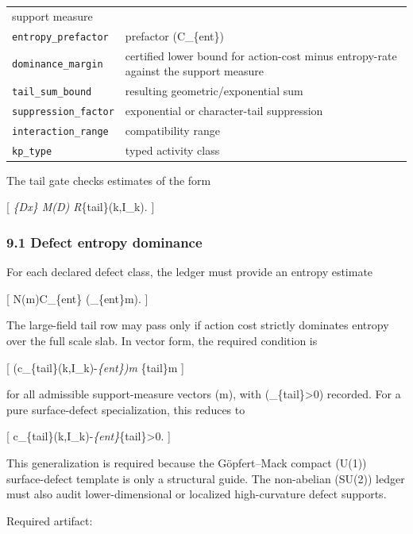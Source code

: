 \documentclass[
]{article}
\begin{document}
\begin{longtable}[]{@{}
  >{\raggedright\arraybackslash}p{}
  >{\raggedright\arraybackslash}p{}@{}}
support measure \\
\texttt{entropy\_prefactor} & prefactor (C\_\{\rm ent\}) \\
\texttt{dominance\_margin} & certified lower bound for action-cost minus
entropy-rate against the support measure \\
\texttt{tail\_sum\_bound} & resulting geometric/exponential sum \\
\texttt{suppression\_factor} & exponential or character-tail
suppression \\
\texttt{interaction\_range} & compatibility range \\
\texttt{kp\_type} & typed activity class \\
\end{longtable}

The tail gate checks estimates of the form

{[} \sum\emph{\{D\ni x\} M(D)
\exp{}\le R}\{\rm tail\}(k,I\_k).
{]}

\subsubsection{9.1 Defect entropy
dominance}\label{defect-entropy-dominance}

For each declared defect class, the ledger must provide an entropy
estimate

{[} N(\mathbf m)\le C\_\{\rm ent\}
\exp\left(\boldsymbol\mu\_\{\rm ent\}\cdot \mathbf m\right). {]}

The large-field tail row may pass only if action cost strictly dominates
entropy over the full scale slab. In vector form, the required condition
is

{[}
\left(\mathbf c\_\{\rm tail\}(k,I\_k)-\boldsymbol\mu\emph{\{\rm ent\}\right)\cdot\mathbf m
\ge \delta}\{\rm tail\}\textbar{}\mathbf m\textbar{} {]}

for all admissible support-measure vectors (\mathbf m), with
(\delta\_\{\rm tail\}\textgreater0) recorded. For a pure surface-defect
specialization, this reduces to

{[}
c\_\{\rm tail\}(k,I\_k)-\mu\emph{\{\rm ent\}\ge\delta}\{\rm tail\}\textgreater0.
{]}

This generalization is required because the Göpfert--Mack compact (U(1))
surface-defect template is only a structural guide. The non-abelian
(SU(2)) ledger must also audit lower-dimensional or localized
high-curvature defect supports.

Required artifact:
\end{document}
